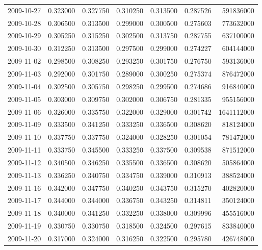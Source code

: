 \begin{tabular}{lrrrrrr}
2009-10-27 &    0.323000 &    0.327750 &    0.310250 &    0.313500 &    0.287526 &   591836000 \\
2009-10-28 &    0.306500 &    0.313500 &    0.299000 &    0.300500 &    0.275603 &   773632000 \\
2009-10-29 &    0.305250 &    0.315250 &    0.302500 &    0.313750 &    0.287755 &   637100000 \\
2009-10-30 &    0.312250 &    0.313500 &    0.297500 &    0.299000 &    0.274227 &   604144000 \\
2009-11-02 &    0.298500 &    0.308250 &    0.293250 &    0.301750 &    0.276750 &   593136000 \\
2009-11-03 &    0.292000 &    0.301750 &    0.289000 &    0.300250 &    0.275374 &   876472000 \\
2009-11-04 &    0.302500 &    0.305750 &    0.298250 &    0.299500 &    0.274686 &   916840000 \\
2009-11-05 &    0.303000 &    0.309750 &    0.302000 &    0.306750 &    0.281335 &   955156000 \\
2009-11-06 &    0.326000 &    0.335750 &    0.322000 &    0.329000 &    0.301742 &  1641112000 \\
2009-11-09 &    0.333500 &    0.341250 &    0.333250 &    0.336500 &    0.308620 &   818124000 \\
2009-11-10 &    0.337750 &    0.337750 &    0.324000 &    0.328250 &    0.301054 &   781472000 \\
2009-11-11 &    0.333750 &    0.345500 &    0.333250 &    0.337500 &    0.309538 &   871512000 \\
2009-11-12 &    0.340500 &    0.346250 &    0.335500 &    0.336500 &    0.308620 &   505864000 \\
2009-11-13 &    0.336250 &    0.340750 &    0.334750 &    0.339000 &    0.310913 &   388524000 \\
2009-11-16 &    0.342000 &    0.347750 &    0.340250 &    0.343750 &    0.315270 &   402820000 \\
2009-11-17 &    0.344000 &    0.344000 &    0.336750 &    0.343250 &    0.314811 &   350124000 \\
2009-11-18 &    0.340000 &    0.341250 &    0.332250 &    0.338000 &    0.309996 &   455516000 \\
2009-11-19 &    0.330750 &    0.330750 &    0.318500 &    0.324500 &    0.297615 &   833840000 \\
2009-11-20 &    0.317000 &    0.324000 &    0.316250 &    0.322500 &    0.295780 &   426748000 \\

\end{tabular}
